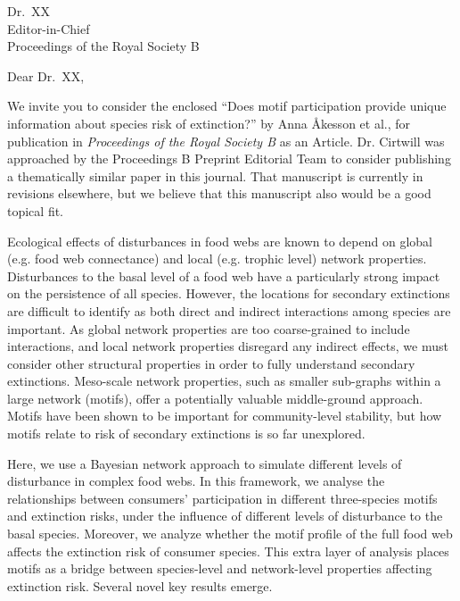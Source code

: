 \documentclass[10.5pt]{letter}
\date{October XX, 2021}
\begin{document}
\begin{letter}{
\vspace{-2.5cm}

Dr.~XX\\
Editor-in-Chief\\
Proceedings of the Royal Society B} %


\opening{Dear Dr.~XX,}

We invite you to consider the enclosed ``Does motif participation provide unique information about species risk of extinction?'' by Anna {\AA}kesson et al., for publication in \emph{Proceedings of the Royal Society B} as an Article. Dr. Cirtwill was approached by the Proceedings B Preprint Editorial Team to consider publishing a thematically similar paper in this journal. That manuscript is currently in revisions elsewhere, but we believe that this manuscript also would be a good topical fit. %

Ecological effects of disturbances in food webs are known to depend on global (e.g. food web connectance) and local (e.g. trophic level) network properties. Disturbances to the basal level of a food web have a particularly strong impact on the persistence of all species. 
However, the locations for secondary extinctions are difficult to identify as both direct and indirect interactions among species are important. As global network properties are too coarse-grained to include interactions, and local network properties disregard any indirect effects, we must consider other structural properties in order to fully understand secondary extinctions. Meso-scale network properties, such as smaller sub-graphs within a large network (motifs), offer a potentially valuable middle-ground approach. Motifs have been shown to be important for community-level stability, but how motifs relate to risk of secondary extinctions is so far unexplored.   

Here, we use a Bayesian network approach to simulate different levels of disturbance in complex food webs.
In this framework, we analyse the relationships between consumers' participation in different three-species motifs and extinction risks, under the influence of different levels of disturbance to the basal species. 
Moreover, we analyze whether the motif profile of the full food web affects the extinction risk of consumer species.
This extra layer of analysis places motifs as a bridge between species-level and network-level properties affecting extinction risk.
Several novel key results emerge.


\end{letter}
\end{document}
